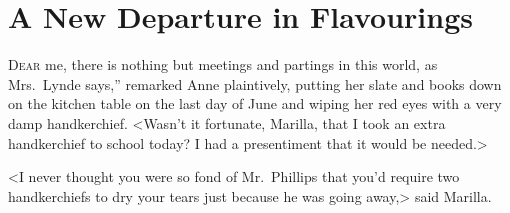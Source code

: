 \chapter{A New Departure in Flavourings}

\lettrine[ante=“,]{D}{ear} me, there is nothing but meetings and partings in this world, as Mrs.~Lynde says,” remarked Anne plaintively, putting her slate and books down on the kitchen table on the last day of June and wiping her red eyes with a very damp handkerchief. <Wasn't it fortunate, Marilla, that I took an extra handkerchief to school today? I had a presentiment that it would be needed.>

<I never thought you were so fond of Mr.~Phillips that you'd require two handkerchiefs to dry your tears just because he was going away,> said Marilla.

